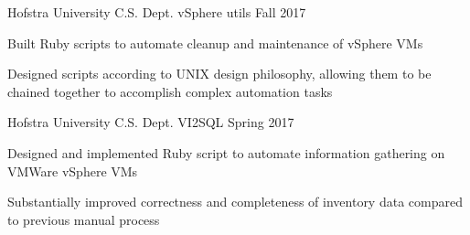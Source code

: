 \begin{cventries}


\cventry    
  {Hofstra University C.S. Dept.} %
  {vSphere utils} %
  {}
  {Fall 2017}
  {
    \begin{cvitems} %
    \item {Built Ruby scripts to automate cleanup and maintenance of vSphere VMs}
    \item {Designed scripts according to UNIX design philosophy, allowing them to be chained together to accomplish complex automation tasks}
    \end{cvitems}
  }
   
\cventry
    {Hofstra University C.S. Dept.} %
    {VI2SQL} %
    {}
    {Spring 2017}
    {
      \begin{cvitems} %
        \item {Designed and implemented Ruby script to automate information gathering on VMWare vSphere VMs}
        \item {Substantially improved correctness and completeness of inventory data compared to previous manual process}
      \end{cvitems}
    }

\end{cventries}